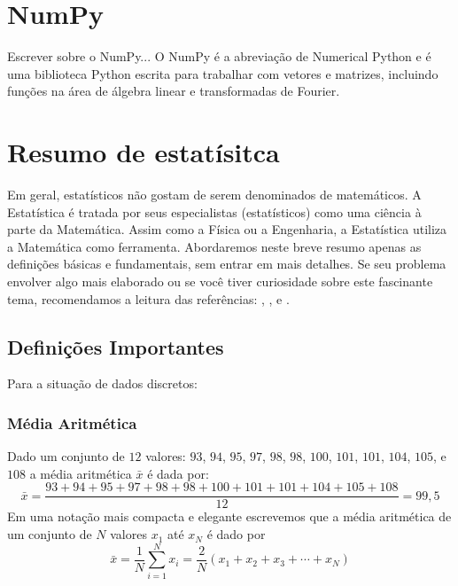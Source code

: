 
\section{NumPy}
Escrever sobre o NumPy...
O NumPy é a abreviação de Numerical Python e é uma biblioteca Python escrita para trabalhar com vetores e matrizes, incluindo funções na área de álgebra linear e transformadas de Fourier. \cite{NumPyUserGuideRelease1.18.1}



\section{Resumo de estatísitca}

Em geral, estatísticos não gostam de serem denominados de matemáticos. A Estatística é tratada por seus especialistas (estatísticos) como uma ciência à parte da Matemática. Assim como a Física ou a Engenharia, a Estatística utiliza a Matemática como ferramenta. Abordaremos neste breve resumo apenas as definições básicas e fundamentais, sem entrar em mais detalhes. Se seu problema envolver algo mais elaborado ou se você tiver curiosidade sobre este fascinante tema, recomendamos a leitura das referências:   \cite{Est_Bussab}, \cite{Est_NilzaNunes}, \cite{EST_Montgomery} e \cite{Est_Meyer}.


\subsection{Definições Importantes}
Para a situação de dados discretos:
\subsubsection{Média Aritmética}
Dado um conjunto de $12$ valores: $93$, $94$, $95$, $97$, $98$, $98$, $100$, $101$, $101$, $104$, $105$, e $108$ a média aritmética $\bar x$ é dada por:
\[
\bar x = \frac{93+94+95+97+98+98+100+101+101+104+105+108}{12}  = 99,5   
\]
Em uma notação mais compacta e elegante escrevemos que a média aritmética de um conjunto de $N$ valores $x_1$ até $x_N$ é dado por
\[
    \bar x = \frac{1}{N}\sum_{i=1}^N x_i = \frac{2}{N} (x_1 + x_2 + x_3 + \cdots + x_N )
\]


